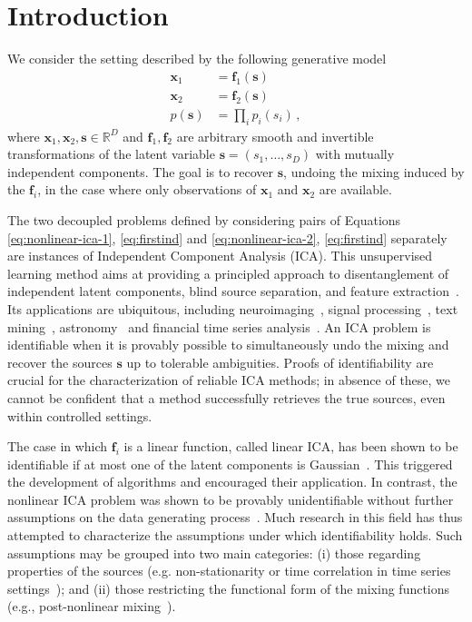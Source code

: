 \section{Introduction}

We consider the setting described by the following generative model    \begin{align}
        \bm{x}_1 &= \bm{f}_1(\bm{s}) \label{eq:nonlinear-ica-1}\\
        \bm{x}_2 &= \bm{f}_2(\bm{s}) \label{eq:nonlinear-ica-2}\\
        p(\bm{s}) &= \prod_{i} p_i(s_i) \label{eq:firstind}\,,
    \end{align}
where $\bm{x}_1, \bm{x}_2, \bm{s} \in \mathbb{R}^D$ and $\bm{f}_1, \bm{f}_2$ are arbitrary smooth and invertible transformations of the latent variable $\bm{s} = (s_1, \ldots, s_D)$ with mutually independent components.
The goal is to recover $\bm{s}$, undoing the mixing induced by the $\bm{f}_i$, in the case where only observations of $\bm{x}_1$ and $\bm{x}_2$ are available.

The two decoupled problems defined by considering pairs of Equations \ref{eq:nonlinear-ica-1}, \ref{eq:firstind} and \ref{eq:nonlinear-ica-2}, \ref{eq:firstind} separately are instances of Independent Component Analysis (ICA). This unsupervised learning method aims at providing a principled approach to disentanglement of independent latent components, blind source separation, and feature extraction~\cite{hyvarinen2000independent}. Its applications are ubiquitous, including neuroimaging~\cite{mckeown1998independent}, signal processing~\cite{sawada2003direction}, text mining~\cite{honkela2010wordica}, astronomy~\cite{nuzillard2000blind} and financial time series analysis~\cite{oja2000independent}.
An ICA problem is identifiable when it is provably possible to simultaneously undo the mixing and recover the sources $\bm{s}$
up to tolerable ambiguities.
Proofs of identifiability are crucial for the characterization of reliable ICA methods; in absence of these, we cannot be confident that a method successfully retrieves the true sources, even within controlled settings.

The case in which $\bm{f}_i$ is a linear function, called linear ICA, has been shown to be identifiable if at most one of the latent components is Gaussian~\cite{darmois1953analyse, skitovich1954linear, comon1994independent}.
This triggered the development of algorithms and encouraged their application. In contrast, the nonlinear ICA problem was shown to be provably unidentifiable without further assumptions on the data generating process~\cite{hyvarinen1999nonlinear}.
Much research in this field has thus attempted to characterize the assumptions under which identifiability holds.
Such assumptions may be grouped into two main categories: (i) those regarding properties of the sources (e.g. non-stationarity or time correlation in time series settings~\cite{cardoso2001three, singer2008non}); and (ii) those restricting the functional form of the mixing functions (e.g., post-nonlinear mixing~\cite{taleb1999source}).

